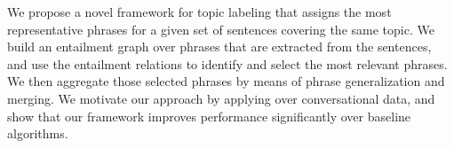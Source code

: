 We propose a novel framework for topic labeling that assigns the most representative phrases for a given set of sentences covering the same topic. We
 build an entailment graph over phrases that are extracted from the sentences,
 and use the entailment relations to identify and select the most relevant
 phrases. We then aggregate those selected phrases by means of phrase
 generalization and merging. We motivate our approach by applying over
 conversational data, and show that our framework improves performance
 significantly over baseline algorithms.

